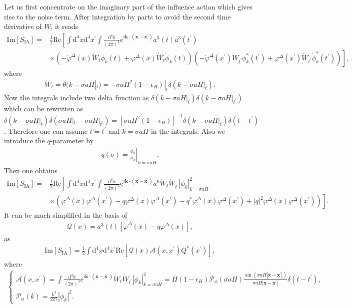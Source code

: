 \documentclass[aps, prd
, preprint
, nofootinbib 
]{revtex4-1}
\newcommand{\dd}{\mathrm{d}}
\newcommand{\ee}{\mathrm{e}}
\newcommand{\calP}{\mathcal{P}}
\renewcommand{\Re}{\mathrm{Re}}
\renewcommand{\Im}{\mathrm{Im}}
\newcommand{\dk}{\frac{\dd^3k}{(2\pi)^3}}
\newcommand{\bae}[1]{\begin{align} #1 \end{align}}
\newcommand{\bce}[1]{\begin{cases} #1 \end{cases}}
\begin{document}
Let us first concentrate on the imaginary part of the influence action which gives rise to the noise term.
After integration by parts to avoid the second time derivative of $W$, it reads
\bae{
	\Im[S_\text{IA}]=&\frac{1}{2}\Re\left[\int\dd^4x\dd^4x^\prime\int\dk\ee^{i\mathbf{k}\cdot(\mathbf{x}-\mathbf{x}^\prime)} 
	a^3(t)a^3(t^\prime)\right. \nonumber \\
	&\left.\times\left(-\dot{\varphi}^\Delta(x)\dot{W}_t\phi_k(t)+\varphi^\Delta(x)\dot{W}_t\dot{\phi}_k(t)\right)
	\left(-\dot{\varphi}^\Delta(x^\prime)\dot{W}_{t^\prime}\phi_k^*(t^\prime)
	+\varphi^\Delta(x^\prime)\dot{W}_{t^\prime}\dot{\phi}_k^*(t^\prime)\right)\right],
}
where
\bae{
	\dot{W}_t=\dot{\theta}(k-\sigma aH|_t)=-\sigma aH^2(1-\epsilon_H)|_t\delta(k-\sigma aH|_t).
}
Now the integrals include two delta function as $\delta(k-\sigma aH|_t)\delta(k-\sigma aH|_{t^\prime})$ which
can be rewritten as 
$\delta(k-\sigma aH|_t)\delta(\sigma aH|_t-\sigma aH|_{t^\prime})=[\sigma aH^2(1-\epsilon_H)]^{-1}\delta(k-\sigma aH|_t)\delta(t-t^\prime)$.
Therefore one can assume $t=t^\prime$ and $k=\sigma aH$ in the integrals.
Also we introduce the $q$-parameter by
\bae{
	q(\sigma)=\left.\frac{\dot{\phi}_k}{\phi_k}\right|_{k=\sigma aH}.
}
Then one obtains
\bae{
	\Im[S_\text{IA}]=&\frac{1}{2}\Re\left[\int\dd^4x\dd^4x^\prime\int\dk\ee^{i\mathbf{k}\cdot(\mathbf{x}-\mathbf{x}^\prime)}
	a^6\dot{W}_t\dot{W}_{t^\prime}|\phi_k|^2_{k=\sigma aH} \right. \nonumber \\
	&\left.\times\left(\dot{\varphi}^\Delta(x)\dot{\varphi}^\Delta(x^\prime)-q\varphi^\Delta(x)\dot{\varphi}^\Delta(x^\prime)
	-q^*\dot{\varphi}^\Delta(x)\varphi^\Delta(x^\prime)+|q|^2\varphi^\Delta(x)\varphi^\Delta(x^\prime)\right)\right].
}
It can be much simplified in the basis of
\bae{
	\mathcal{Q}(x)=a^3(t)[\dot{\varphi}^\Delta(x)-q\varphi^\Delta(x)],
}
as
\bae{
	\Im[S_\text{IA}]=\frac{1}{2}\int\dd^4x\dd^4x^\prime\Re\left[\mathcal{Q}(x)\mathcal{A}(x,x^\prime)Q^*(x^\prime)\right],
}
where
\bae{
	\bce{
		\displaystyle
		\mathcal{A}(x,x^\prime)=\int\dk\ee^{i\mathbf{k}\cdot(\mathbf{x}-\mathbf{x}^\prime)}\dot{W}_t\dot{W}_{t^\prime}|\phi_k|^2_{k=\sigma aH}
		=H(1-\epsilon_H)\calP_\phi(\sigma aH)\frac{\sin(\sigma aH|\mathbf{x}-\mathbf{x}^\prime|)}{\sigma aH|\mathbf{x}-\mathbf{x}^\prime|}
		\delta(t-t^\prime), \\[10pt]
		\displaystyle
		\calP_\phi(k)=\frac{k^3}{2\pi^2}|\phi_k|^2.
	}
}
\end{document}
